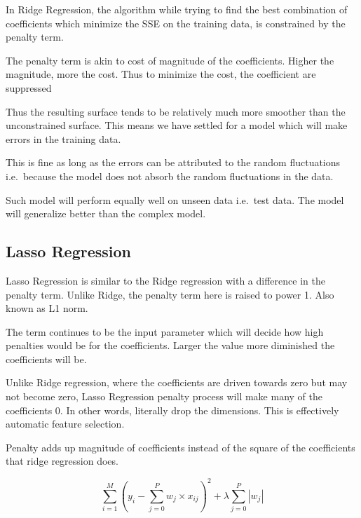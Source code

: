 	\begin{bulletedlist}
		\item In Ridge Regression, the algorithm while trying to find the best combination of coefficients which minimize the SSE on the training data, is constrained by the penalty term.
		\item The penalty term is akin to cost of magnitude of the coefficients. Higher the magnitude, more the cost. Thus to minimize the cost, the coefficient are suppressed
		\item Thus the resulting surface tends to be relatively much more smoother than the unconstrained surface. This means we have settled for a model which will make errors in the
training data.
		\item This is fine as long as the errors can be attributed to the random fluctuations i.e.\ because the model does not absorb the random fluctuations in the data.
		\item Such model will perform equally well on unseen data i.e.\ test data. The model will generalize better than the complex model.
	\end{bulletedlist}

	\subsection{Lasso Regression}

	\begin{bulletedlist}
		\item Lasso Regression is similar to the Ridge regression with a difference in the penalty term. Unlike Ridge, the penalty term here is raised to power 1. Also known as L1 norm.
		\item The term continues to be the input parameter which will decide how high penalties would be for the coefficients. Larger the value more diminished the coefficients will be.
		\item Unlike Ridge regression, where the coefficients are driven towards zero but may not become zero, Lasso Regression penalty process will make many of the coefficients 0. In other words, literally drop the dimensions.  This is effectively automatic feature selection.
		\item Penalty adds up magnitude of coefficients instead of the square of the coefficients that ridge regression does.
	\end{bulletedlist}

	\begin{equation}
		\sum^M_{i=1} \left(y_i - \sum^P_{j=0} w_j \times x_{ij} \right)^2  +  \lambda \sum^P_{j=0} \left| w_j \right|
	\end{equation}


